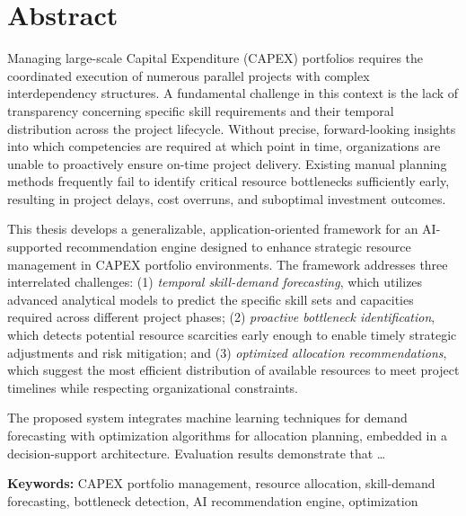 \chapter*{Abstract}

Managing large-scale Capital Expenditure (CAPEX) portfolios requires the coordinated execution of numerous parallel projects with complex interdependency structures. A fundamental challenge in this context is the lack of transparency concerning specific skill requirements and their temporal distribution across the project lifecycle. Without precise, forward-looking insights into which competencies are required at which point in time, organizations are unable to proactively ensure on-time project delivery. Existing manual planning methods frequently fail to identify critical resource bottlenecks sufficiently early, resulting in project delays, cost overruns, and suboptimal investment outcomes.

This thesis develops a generalizable, application-oriented framework for an AI-supported recommendation engine designed to enhance strategic resource management in CAPEX portfolio environments. The framework addresses three interrelated challenges: (1) \textit{temporal skill-demand forecasting}, which utilizes advanced analytical models to predict the specific skill sets and capacities required across different project phases; (2) \textit{proactive bottleneck identification}, which detects potential resource scarcities early enough to enable timely strategic adjustments and risk mitigation; and (3) \textit{optimized allocation recommendations}, which suggest the most efficient distribution of available resources to meet project timelines while respecting organizational constraints.

The proposed system integrates machine learning techniques for demand forecasting with optimization algorithms for allocation planning, embedded in a decision-support architecture. Evaluation results demonstrate that \ldots %

\bigskip
\noindent\textbf{Keywords:} CAPEX portfolio management, resource allocation, skill-demand forecasting, bottleneck detection, AI recommendation engine, optimization

